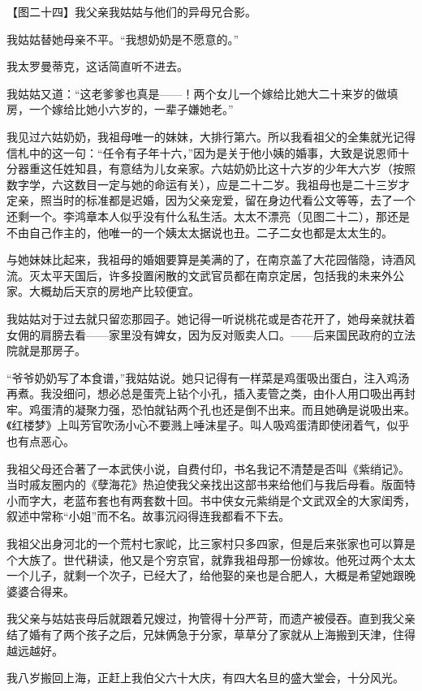 \clearpage
\par 【图二十四】我父亲我姑姑与他们的异母兄合影。
\par 我姑姑替她母亲不平。“我想奶奶是不愿意的。”
\par 我太罗曼蒂克，这话简直听不进去。
\par 我姑姑又道：“这老爹爹也真是——！两个女儿一个嫁给比她大二十来岁的做填房，一个嫁给比她小六岁的，一辈子嫌她老。”
\par 我见过六姑奶奶，我祖母唯一的妹妹，大排行第六。所以我看祖父的全集就光记得信札中的这一句：“任令有子年十六，”因为是关于他小姨的婚事，大致是说恩师十分器重这任姓知县，有意结为儿女亲家。六姑奶奶比这十六岁的少年大六岁（按照数字学，六这数目一定与她的命运有关），应是二十二岁。我祖母也是二十三岁才定亲，照当时的标准都是迟婚，因为父亲宠爱，留在身边代看公文等等，去了一个还剩一个。李鸿章本人似乎没有什么私生活。太太不漂亮（见图二十二），那还是不由自己作主的，他唯一的一个姨太太据说也丑。二子二女也都是太太生的。
\par 与她妹妹比起来，我祖母的婚姻要算是美满的了，在南京盖了大花园偕隐，诗酒风流。灭太平天国后，许多投置闲散的文武官员都在南京定居，包括我的未来外公家。大概劫后天京的房地产比较便宜。
\par 我姑姑对于过去就只留恋那园子。她记得一听说桃花或是杏花开了，她母亲就扶着女佣的肩膀去看——家里没有婢女，因为反对贩卖人口。——后来国民政府的立法院就是那房子。
\par “爷爷奶奶写了本食谱，”我姑姑说。她只记得有一样菜是鸡蛋吸出蛋白，注入鸡汤再煮。我没细问，想必总是蛋壳上钻个小孔，插入麦管之类，由仆人用口吸出再封牢。鸡蛋清的凝聚力强，恐怕就钻两个孔也还是倒不出来。而且她确是说吸出来。《红楼梦》上叫芳官吹汤小心不要溅上唾沫星子。叫人吸鸡蛋清即使闭着气，似乎也有点恶心。
\par 我祖父母还合著了一本武侠小说，自费付印，书名我记不清楚是否叫《紫绡记》。当时戚友圈内的《孽海花》热迫使我父亲找出这部书来给他们与我后母看。版面特小而字大，老蓝布套也有两套数十回。书中侠女元紫绡是个文武双全的大家闺秀，叙述中常称“小姐”而不名。故事沉闷得连我都看不下去。
\par 我祖父出身河北的一个荒村七家岮，比三家村只多四家，但是后来张家也可以算是个大族了。世代耕读，他又是个穷京官，就靠我祖母那一份嫁妆。他死过两个太太一个儿子，就剩一个次子，已经大了，给他娶的亲也是合肥人，大概是希望她跟晚婆婆合得来。
\par 我父亲与姑姑丧母后就跟着兄嫂过，拘管得十分严苛，而遗产被侵吞。直到我父亲结了婚有了两个孩子之后，兄妹俩急于分家，草草分了家就从上海搬到天津，住得越远越好。
\par 我八岁搬回上海，正赶上我伯父六十大庆，有四大名旦的盛大堂会，十分风光。
